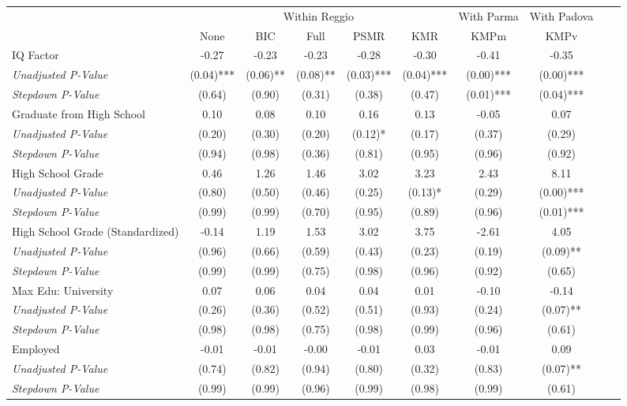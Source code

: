 \begin{tabular}{l c c c c c c c c c}
\toprule
& \multicolumn{5}{c}{Within Reggio} & With Parma & With Padova \\\cmidrule(lr){2-6} \cmidrule(lr){7} \cmidrule(lr){8}
 & None & BIC & Full & PSMR & KMR & KMPm & KMPv \\
\midrule
IQ Factor & -0.27 & -0.23 & -0.23 & -0.28 & -0.30 & -0.41 & -0.35 \\
\quad \textit{Unadjusted P-Value} & (0.04)*** & (0.06)** & (0.08)** & (0.03)*** & (0.04)*** & (0.00)*** & (0.00)*** \\
\quad \textit{Stepdown P-Value} & (0.64) & (0.90) & (0.31) & (0.38) & (0.47) & (0.01)*** & (0.04)*** \\
Graduate from High School & 0.10 & 0.08 & 0.10 & 0.16 & 0.13 & -0.05 & 0.07 \\
\quad \textit{Unadjusted P-Value} & (0.20) & (0.30) & (0.20) & (0.12)* & (0.17) & (0.37) & (0.29) \\
\quad \textit{Stepdown P-Value} & (0.94) & (0.98) & (0.36) & (0.81) & (0.95) & (0.96) & (0.92) \\
High School Grade & 0.46 & 1.26 & 1.46 & 3.02 & 3.23 & 2.43 & 8.11 \\
\quad \textit{Unadjusted P-Value} & (0.80) & (0.50) & (0.46) & (0.25) & (0.13)* & (0.29) & (0.00)*** \\
\quad \textit{Stepdown P-Value} & (0.99) & (0.99) & (0.70) & (0.95) & (0.89) & (0.96) & (0.01)*** \\
High School Grade (Standardized) & -0.14 & 1.19 & 1.53 & 3.02 & 3.75 & -2.61 & 4.05 \\
\quad \textit{Unadjusted P-Value} & (0.96) & (0.66) & (0.59) & (0.43) & (0.23) & (0.19) & (0.09)** \\
\quad \textit{Stepdown P-Value} & (0.99) & (0.99) & (0.75) & (0.98) & (0.96) & (0.92) & (0.65) \\
Max Edu: University & 0.07 & 0.06 & 0.04 & 0.04 & 0.01 & -0.10 & -0.14 \\
\quad \textit{Unadjusted P-Value} & (0.26) & (0.36) & (0.52) & (0.51) & (0.93) & (0.24) & (0.07)** \\
\quad \textit{Stepdown P-Value} & (0.98) & (0.98) & (0.75) & (0.98) & (0.99) & (0.96) & (0.61) \\
Employed & -0.01 & -0.01 & -0.00 & -0.01 & 0.03 & -0.01 & 0.09 \\
\quad \textit{Unadjusted P-Value} & (0.74) & (0.82) & (0.94) & (0.80) & (0.32) & (0.83) & (0.07)** \\
\quad \textit{Stepdown P-Value} & (0.99) & (0.99) & (0.96) & (0.99) & (0.98) & (0.99) & (0.61) \\

\end{tabular}
